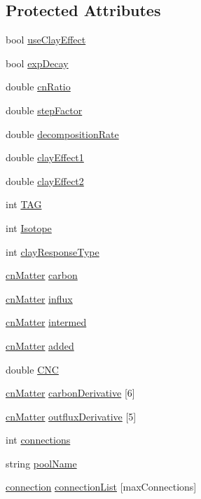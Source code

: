 \subsection*{Protected Attributes}
\begin{DoxyCompactItemize}
\item 
bool \hyperlink{classmatter_ad8689f25569a1686e00d30c19c3d3cd5}{useClayEffect}
\item 
bool \hyperlink{classmatter_a37d97592f65bb759756fbc1e725bfc40}{expDecay}
\item 
double \hyperlink{classmatter_a469812ff5f5548cc57e8aaf905422d59}{cnRatio}
\item 
double \hyperlink{classmatter_a04cfcfcbd4523bfbcb6ae73808f1796b}{stepFactor}
\item 
double \hyperlink{classmatter_a2b043f2c674031ceb99a1ac1451a715e}{decompositionRate}
\item 
double \hyperlink{classmatter_a1da4af6772cb60316fe1152209eb2835}{clayEffect1}
\item 
double \hyperlink{classmatter_a79e544386cdb596986c6bf1396a6d79b}{clayEffect2}
\item 
int \hyperlink{classmatter_aa5542096a167bed6ed8eafd696816599}{TAG}
\item 
int \hyperlink{classmatter_a66af6caaa54804a6bcd353f587994a51}{Isotope}
\item 
int \hyperlink{classmatter_a6b25cecac355a09e902930ef2138041f}{clayResponseType}
\item 
\hyperlink{classcn_matter}{cnMatter} \hyperlink{classmatter_ac47ac49f037d82b8d1cdc16275f341e4}{carbon}
\item 
\hyperlink{classcn_matter}{cnMatter} \hyperlink{classmatter_abdf3e98bc03005e58bd57df3e9bbd988}{influx}
\item 
\hyperlink{classcn_matter}{cnMatter} \hyperlink{classmatter_a1dd0c9ddeb3e81f74812a24221c4132a}{intermed}
\item 
\hyperlink{classcn_matter}{cnMatter} \hyperlink{classmatter_accdb39d94bfbf28e30c45c063c31c630}{added}
\item 
double \hyperlink{classmatter_aa9674ae514deddbaccbad950ef1da56f}{CNC}
\item 
\hyperlink{classcn_matter}{cnMatter} \hyperlink{classmatter_aee9a37b271a52658a03a7350a173afae}{carbonDerivative} \mbox{[}6\mbox{]}
\item 
\hyperlink{classcn_matter}{cnMatter} \hyperlink{classmatter_aee1bc7ca345e58bd4e203af721b0c8d7}{outfluxDerivative} \mbox{[}5\mbox{]}
\item 
int \hyperlink{classmatter_a4a8f7cc7089b86f9e401424f648ccdf3}{connections}
\item 
string \hyperlink{classmatter_aa5a52c9da8fc5f18e214c66c92bf3759}{poolName}
\item 
\hyperlink{structmatter_1_1connection}{connection} \hyperlink{classmatter_ac73565a1dbd68219dbcb7e4199cffb12}{connectionList} \mbox{[}maxConnections\mbox{]}
\end{DoxyCompactItemize}


